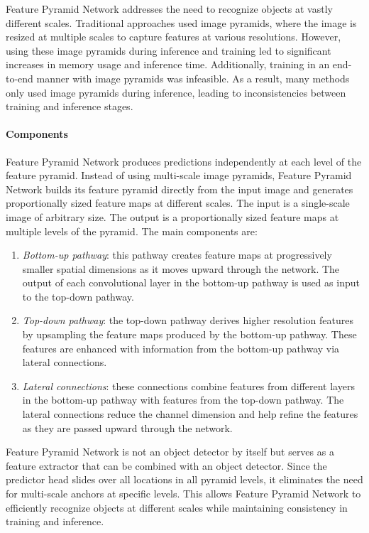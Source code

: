 Feature Pyramid Network addresses the need to recognize objects at vastly different scales. 
Traditional approaches used image pyramids, where the image is resized at multiple scales to capture features at various resolutions. 
However, using these image pyramids during inference and training led to significant increases in memory usage and inference time. 
Additionally, training in an end-to-end manner with image pyramids was infeasible. As a result, many methods only used image pyramids during inference, leading to inconsistencies between training and inference stages.

\paragraph*{Components}
Feature Pyramid Network produces predictions independently at each level of the feature pyramid. 
Instead of using multi-scale image pyramids, Feature Pyramid Network builds its feature pyramid directly from the input image and generates proportionally sized feature maps at different scales.
The input is a single-scale image of arbitrary size.
The output is a proportionally sized feature maps at multiple levels of the pyramid.
The main components are: 
\begin{enumerate}
    \item \textit{Bottom-up pathway}: this pathway creates feature maps at progressively smaller spatial dimensions as it moves upward through the network. 
        The output of each convolutional layer in the bottom-up pathway is used as input to the top-down pathway.
    \item \textit{Top-down pathway}: the top-down pathway derives higher resolution features by upsampling the feature maps produced by the bottom-up pathway. 
        These features are enhanced with information from the bottom-up pathway via lateral connections. 
    \item \textit{Lateral connections}: these connections combine features from different layers in the bottom-up pathway with features from the top-down pathway. 
        The lateral connections reduce the channel dimension and help refine the features as they are passed upward through the network.
\end{enumerate}
Feature Pyramid Network is not an object detector by itself but serves as a feature extractor that can be combined with an object detector. 
Since the predictor head slides over all locations in all pyramid levels, it eliminates the need for multi-scale anchors at specific levels. 
This allows Feature Pyramid Network to efficiently recognize objects at different scales while maintaining consistency in training and inference.

